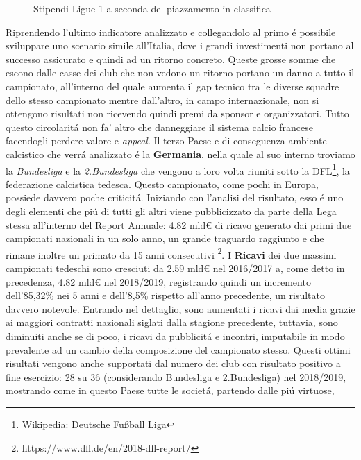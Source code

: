 \documentclass[
    corpo=12pt,
    oneside,
    evenboxes,
    tipotesi=triennale,
    stile=classica,
    oldstyle,
    autoretitolo,
    greek,
]{toptesi}
\begin{document}
\begin{interlinea}{1.5}
\begin{figure}
    \caption{Stipendi Ligue 1 a seconda del piazzamento in classifica}
    \label{stipendi_ligue1}
\end{figure}
Riprendendo l'ultimo indicatore analizzato e collegandolo al primo \'e possibile sviluppare uno scenario simile all'Italia, dove
i grandi investimenti non portano al successo assicurato e quindi ad un ritorno concreto. Queste grosse somme che escono dalle casse 
dei club che non vedono un ritorno portano un danno a tutto il campionato, all'interno del quale aumenta il gap tecnico tra le diverse squadre dello
stesso campionato mentre dall'altro, in campo internazionale, non si ottengono risultati non ricevendo quindi premi da sponsor e organizzatori.
Tutto questo circolarit\'a non fa' altro che danneggiare il sistema calcio francese facendogli perdere valore e \emph{appeal}.\newline
Il terzo Paese e di conseguenza ambiente calcistico che verr\'a analizzato \'e la \linebreak \textbf{Germania}, nella quale al suo interno troviamo 
la \emph{Bundesliga} e la \emph{2.Bundesliga} che vengono a loro volta riuniti sotto la DFL\footnote{Wikipedia: Deutsche Fußball Liga}, la
federazione calcistica tedesca.\newline 
Questo campionato, come pochi in Europa, possiede davvero poche criticit\'a. \linebreak Iniziando con l'analisi del risultato, 
esso \'e uno degli elementi che pi\'u di tutti gli altri viene pubblicizzato 
da parte della Lega stessa all'interno del Report Annuale: 4.82 mld€ di ricavo generato dai primi due campionati nazionali in un 
solo anno, un grande traguardo raggiunto e che rimane inoltre un primato da 15 anni consecutivi
\footnote{https://www.dfl.de/en/2018-dfl-report/}.\newline
I \textbf{Ricavi} dei due massimi campionati tedeschi sono cresciuti da 2.59 mld€ nel 2016/2017 a, come detto in precedenza, 4.82 mld€ nel 2018/2019, 
registrando quindi un incremento dell'85,32\% nei 5 anni e dell'8,5\% rispetto
all'anno precedente, un risultato davvero notevole. Entrando nel dettaglio, sono aumentati i ricavi dai media grazie ai maggiori contratti nazionali 
siglati dalla stagione precedente, tuttavia, sono diminuiti anche se di poco,
i ricavi da pubblicit\'a e incontri, imputabile in modo prevalente ad un cambio della composizione del campionato stesso.
Questi ottimi risultati vengono anche supportati dal numero dei club con risultato positivo a fine esercizio: 28 su 36 (considerando 
Bundesliga e 2.Bundesliga) nel 2018/2019, mostrando come in questo Paese tutte le societ\'a, partendo dalle pi\'u virtuose,

\end{interlinea}
\end{document}
